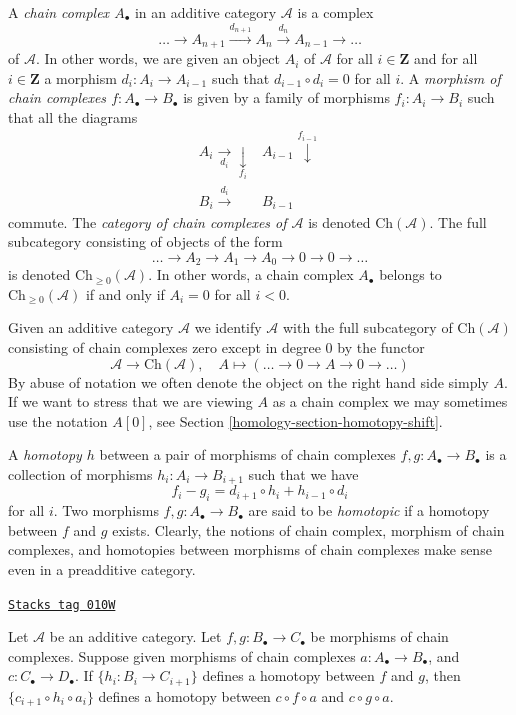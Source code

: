 \medskip\noindent
A {\it chain complex $A_\bullet$} in an additive category $\mathcal{A}$
is a complex
$$
\ldots \to
A_{n + 1} \xrightarrow{d_{n + 1}}
A_n \xrightarrow{d_n}
A_{n - 1} \to
\ldots
$$
of $\mathcal{A}$. In other words, we are given an object $A_i$ of
$\mathcal{A}$ for all $i \in \mathbf{Z}$ and for
all $i \in \mathbf{Z}$ a morphism $d_i : A_i \to A_{i - 1}$ such that
$d_{i - 1} \circ d_i = 0$ for all $i$. A {\it morphism of chain
complexes $f : A_\bullet \to B_\bullet$} is given by a
family of morphisms $f_i : A_i \to B_i$ such that all
the diagrams
$$
\begin{array}{cc}A_i \underset{d_i}{\longrightarrow}\underset{f_i}{\downarrow} & A_{i - 1} \overset{f_{i - 1}}{\downarrow} \\ B_i \overset{d_i}{\longrightarrow} & B_{i - 1}\end{array}
$$
commute. The {\it category of chain complexes of $\mathcal{A}$}
is denoted $\text{Ch}(\mathcal{A})$. The full subcategory consisting
of objects of the form
$$
\ldots \to A_2 \to A_1 \to A_0 \to 0 \to 0 \to \ldots
$$
is denoted $\text{Ch}_{\geq 0}(\mathcal{A})$.
In other words, a chain complex $A_\bullet$ belongs to
$\text{Ch}_{\geq 0}(\mathcal{A})$ if and only if
$A_i = 0$ for all $i < 0$.

\medskip\noindent
Given an additive category $\mathcal{A}$ we identify $\mathcal{A}$
with the full subcategory of $\text{Ch}(\mathcal{A})$ consisting
of chain complexes zero except in degree $0$ by the functor
$$
\mathcal{A} \longrightarrow \text{Ch}(\mathcal{A}),\quad
A \longmapsto (\ldots \to 0 \to A \to 0 \to \ldots)
$$
By abuse of notation we often denote the object on the right hand side
simply $A$. If we want to stress that we are viewing $A$ as a chain
complex we may sometimes use the notation $A[0]$, see
Section \ref{homology-section-homotopy-shift}.

\medskip\noindent
A {\it homotopy $h$} between a pair of morphisms
of chain complexes $f, g : A_\bullet \to B_\bullet$
is a collection of morphisms $h_i : A_i \to B_{i + 1}$
such that we have
$$
f_i - g_i = d_{i + 1} \circ h_i + h_{i - 1} \circ d_i
$$
for all $i$.
Two morphisms $f, g : A_\bullet \to B_\bullet$ are
said to be {\it homotopic} if a homotopy between $f$
and $g$ exists.
Clearly, the notions of chain complex, morphism of
chain complexes, and homotopies between morphisms of chain complexes
make sense even in a preadditive category.

\begin{lemma}
\label{homology-lemma-compose-homotopy}
\href{https://stacks.math.columbia.edu/tag/010W}{\texttt{Stacks tag 010W}}


Let $\mathcal{A}$ be an additive category.
Let $f, g : B_\bullet \to C_\bullet$ be morphisms
of chain complexes. Suppose given morphisms of chain
complexes $a : A_\bullet \to B_\bullet$, and
$c : C_\bullet \to D_\bullet$.
If $\{h_i : B_i \to C_{i + 1}\}$ defines a homotopy
between $f$ and $g$, then $\{c_{i + 1} \circ h_i \circ a_i\}$
defines a homotopy between $c \circ f \circ a$ and
$c \circ g \circ a$.
\end{lemma}

